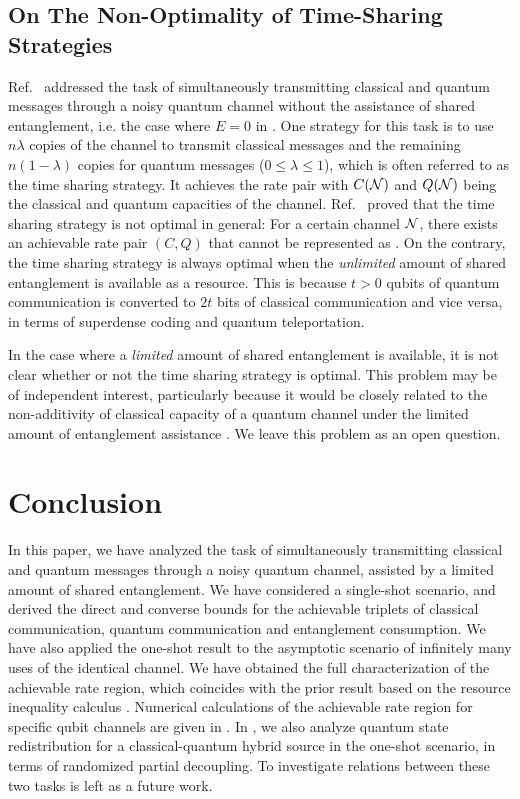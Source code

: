 \documentclass[journal]{IEEEtran}
\begin{document}
\subsection{On The Non-Optimality of Time-Sharing Strategies}

Ref.~\cite{devetak2005capacity} addressed the task of simultaneously transmitting classical and quantum messages through a noisy quantum channel without the assistance of shared entanglement, i.e. the case where $E=0$ in .
One strategy for this task is to use $n\lambda$ copies of the channel to transmit classical messages and the remaining $n(1-\lambda)$ copies for quantum messages ($0\leq\lambda\leq1$), which is often referred to as the time sharing strategy.
It achieves the rate pair
with $C({\mathcal N})$ and $Q({\mathcal N})$ being the classical and quantum capacities of the channel.
Ref.~\cite{devetak2005capacity} proved that the time sharing strategy is not optimal in general: For a certain channel ${\mathcal N}$, there exists an achievable rate pair $(C,Q)$ that cannot be represented as .
On the contrary, the time sharing strategy is always optimal when the {\it unlimited} amount of shared entanglement is available as a resource.
This is because $t>0$ qubits of quantum communication is converted to $2t$ bits of classical communication and vice versa, in terms of superdense coding and quantum teleportation.

In the case where a {\it limited} amount of shared entanglement is available, it is not clear whether or not the time sharing strategy is optimal. 
This problem may be of independent interest, particularly because it would be closely related to the non-additivity of classical capacity of a quantum channel under the limited amount of entanglement assistance \cite{zhu2017superadditivity}.
We leave this problem as an open question.



\section{Conclusion}

In this paper, we have analyzed the task of simultaneously transmitting classical and quantum messages through a noisy quantum channel, assisted by a limited amount of shared entanglement.
We have considered a single-shot scenario, and derived the direct and converse bounds for the achievable triplets of classical communication, quantum communication and entanglement consumption.  
We have also applied the one-shot result to the asymptotic scenario of infinitely many uses of the identical channel.
We have obtained the full characterization of the achievable rate region, which coincides with the prior result based on the resource inequality calculus \cite{hsieh2010entanglement}. 
Numerical calculations of the achievable rate region for specific qubit channels are given in \cite{NMcapacity}.
In \cite{hybridQSR}, we also analyze quantum state redistribution for a classical-quantum hybrid source in the one-shot scenario, in terms of randomized partial decoupling.
To investigate relations between these two tasks is left as a future work.
\end{document}
